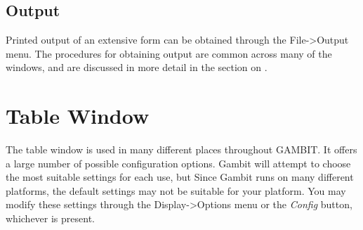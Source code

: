{\subsection{Output} 
Printed output of an extensive form can be obtained through the File->Output 
menu.  The procedures for obtaining output are common across many of the 
windows, and are discussed in more detail in the section on 
. 

\section{Table Window}\label{TableWindow}
The table window is used in many different places throughout GAMBIT.  It 
offers a large number of possible configuration options.  Gambit 
will attempt to choose the most suitable settings for each use, but
Since Gambit runs on many different platforms, the default settings 
may not be suitable for your platform.  You may modify these settings 
through the Display->Options menu or the {\em Config} button, whichever is
present.

}

